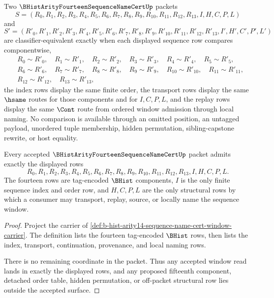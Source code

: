 \begin{definition}
\label{def:b-hist-arity14-sequence-name-cert-window-classifier}
Two $\BHistArityFourteenSequenceNameCertUp$ packets
$$
S=(R_0,R_1,R_2,R_3,R_4,R_5,R_6,R_7,R_8,R_9,R_{10},R_{11},R_{12},R_{13},I,H,C,P,L)
$$
and
$$
S'=(R'_0,R'_1,R'_2,R'_3,R'_4,R'_5,R'_6,R'_7,R'_8,R'_9,R'_{10},R'_{11},R'_{12},R'_{13},I',H',C',P',L')
$$
are classifier-equivalent exactly when each displayed sequence row compares componentwise,
$$
\begin{aligned}
&R_0 \sim R'_0,\quad R_1 \sim R'_1,\quad R_2 \sim R'_2,\quad R_3 \sim R'_3,\quad R_4 \sim R'_4,\quad R_5 \sim R'_5,\\
&R_6 \sim R'_6,\quad R_7 \sim R'_7,\quad R_8 \sim R'_8,\quad R_9 \sim R'_9,\quad R_{10} \sim R'_{10},\quad R_{11} \sim R'_{11},\\
&R_{12} \sim R'_{12},\quad R_{13} \sim R'_{13},
\end{aligned}
$$
the index rows display the same finite order, the transport rows display the same $\hsame$ routes for those components and for $I,C,P,L$, and the replay rows display the same $\Cont$ route from ordered window admission through local naming. No comparison is available through an omitted position, an untagged payload, unordered tuple membership, hidden permutation, sibling-capstone rewrite, or host equality.
\end{definition}

\begin{theorem}
\label{thm:b-hist-arity14-sequence-name-cert-carrier-admission}
Every accepted $\BHistArityFourteenSequenceNameCertUp$ packet admits exactly the displayed rows
$$
R_0,R_1,R_2,R_3,R_4,R_5,R_6,R_7,R_8,R_9,R_{10},R_{11},R_{12},R_{13},I,H,C,P,L.
$$
The fourteen rows are tag-encoded $\BHist$ components, $I$ is the only finite sequence index and order row, and $H,C,P,L$ are the only structural rows by which a consumer may transport, replay, source, or locally name the sequence window.
\end{theorem}
\begin{proof}
Project the carrier of \autoref{def:b-hist-arity14-sequence-name-cert-window-carrier}. The definition lists the fourteen tag-encoded $\BHist$ rows, then lists the index, transport, continuation, provenance, and local naming rows.

There is no remaining coordinate in the packet. Thus any accepted window read lands in exactly the displayed rows, and any proposed fifteenth component, detached order table, hidden permutation, or off-packet structural row lies outside the accepted surface.
\end{proof}

